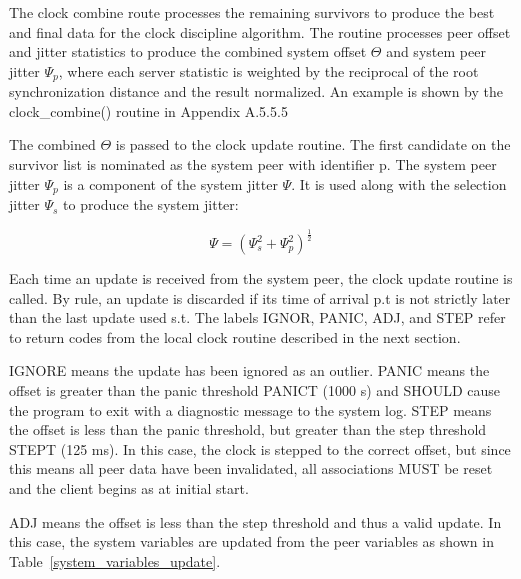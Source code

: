 The clock combine route processes the remaining survivors to produce
the best and final data for the clock discipline algorithm.  The
routine processes peer offset and jitter statistics to produce the
combined system offset $ \Theta $ and system peer jitter $ \Psi_p $, where each
server statistic is weighted by the reciprocal of the root
synchronization distance and the result normalized.  An example is
shown by the clock\_combine() routine in Appendix A.5.5.5

The combined $ \Theta $ is passed to the clock update routine.  The first
candidate on the survivor list is nominated as the system peer with
identifier p.  The system peer jitter $ \Psi_p $ is a component of the
system jitter $ \Psi $.  It is used along with the selection jitter $ \Psi_s $
to produce the system jitter:

$$
\Psi = \left( \Psi_s^2 + \Psi_p^2 \right)^{\frac{1}{2}}
$$

Each time an update is received from the system peer, the clock
update routine is called.  By rule, an update is discarded if its
time of arrival p.t is not strictly later than the last update used
s.t.  The labels IGNOR, PANIC, ADJ, and STEP refer to return codes
from the local clock routine described in the next section.

IGNORE means the update has been ignored as an outlier.  PANIC means
the offset is greater than the panic threshold PANICT (1000 s) and
SHOULD cause the program to exit with a diagnostic message to the
system log.  STEP means the offset is less than the panic threshold,
but greater than the step threshold STEPT (125 ms).  In this case,
the clock is stepped to the correct offset, but since this means all
peer data have been invalidated, all associations MUST be reset and
the client begins as at initial start.

ADJ means the offset is less than the step threshold and thus a valid
update.  In this case, the system variables are updated from the peer
variables as shown in Table~\ref{system_variables_update}.

